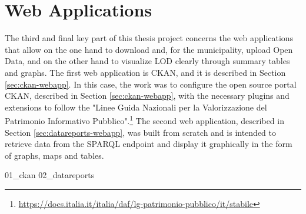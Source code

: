 \chapter{Web Applications}
\label{chp:webapps}

The third and final key part of this thesis project concerns the web applications that allow on the one hand to download and, for the municipality, upload Open Data, and on the other hand to visualize \acl{LOD} clearly through summary tables and graphs. The first web application is CKAN, and it is described in Section \ref{sec:ckan-webapp}. In this case, the work was to configure the open source portal CKAN, described in Section \ref{sec:ckan-webapp}, with the necessary plugins and extensions to follow the "Linee Guida Nazionali per la Valorizzazione del Patrimonio Informativo Pubblico".\footnote{\url{https://docs.italia.it/italia/daf/lg-patrimonio-pubblico/it/stabile}} The second web application, described in Section \ref{sec:datareports-webapp}, was built from scratch and is intended to retrieve data from the \ac{SPARQL} endpoint and display it graphically in the form of graphs, maps and tables.

{01_ckan}%
{02_datareports}%